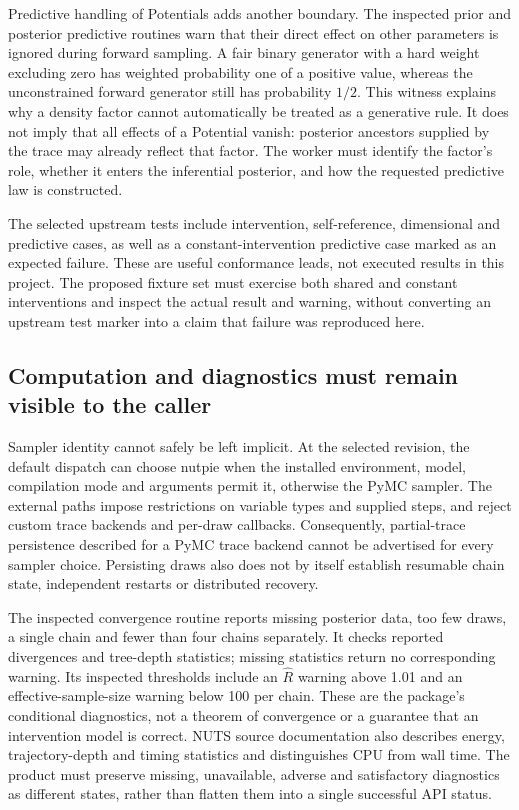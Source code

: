 Predictive handling of Potentials adds another boundary. The inspected prior
and posterior predictive routines warn that their direct effect on other
parameters is ignored during forward sampling. A fair binary generator with
a hard weight excluding zero has weighted probability one of a positive value,
whereas the unconstrained forward generator still has probability $1/2$.
This witness explains why a density factor cannot automatically be treated
as a generative rule. It does not imply that all effects of a Potential vanish:
posterior ancestors supplied by the trace may already reflect that factor.
The worker must identify the factor's role, whether it enters the inferential
posterior, and how the requested predictive law is constructed.
\citep{exec23_pymc_sources,exec23_pymc_reference}

The selected upstream tests include intervention, self-reference, dimensional
and predictive cases, as well as a constant-intervention predictive case marked
as an expected failure. These are useful conformance leads, not executed results
in this project. The proposed fixture set must exercise both shared and constant
interventions and inspect the actual result and warning, without converting
an upstream test marker into a claim that failure was reproduced here.
\citep{exec23_pymc_sources}

\subsection{Computation and diagnostics must remain visible to the caller}
\label{exec23:pymc-decision}

Sampler identity cannot safely be left implicit. At the selected revision,
the default dispatch can choose nutpie when the installed environment, model,
compilation mode and arguments permit it, otherwise the PyMC sampler. The
external paths impose restrictions on variable types and supplied steps,
and reject custom trace backends and per-draw callbacks. Consequently,
partial-trace persistence described for a PyMC trace backend cannot be
advertised for every sampler choice. Persisting draws also does not by itself
establish resumable chain state, independent restarts or distributed recovery.
\citep{exec23_pymc_sources}

The inspected convergence routine reports missing posterior data, too few
draws, a single chain and fewer than four chains separately. It checks
reported divergences and tree-depth statistics; missing statistics return no
corresponding warning. Its inspected thresholds include an $\widehat R$
warning above 1.01 and an effective-sample-size warning below 100 per chain.
These are the package's conditional diagnostics, not a theorem of convergence
or a guarantee that an intervention model is correct. NUTS source documentation
also describes energy, trajectory-depth and timing statistics and distinguishes
CPU from wall time. The product must preserve missing, unavailable, adverse
and satisfactory diagnostics as different states, rather than flatten them
into a single successful API status.
\citep{exec23_pymc_sources}

